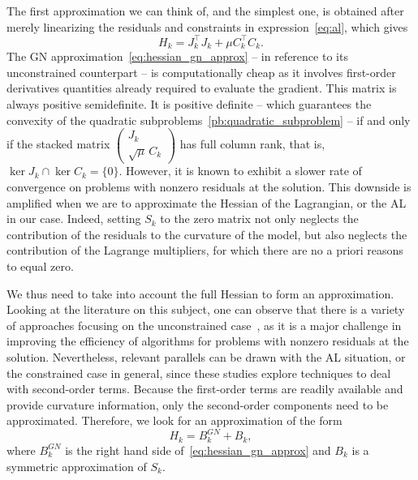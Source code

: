 \documentclass{article}
\numberwithin{equation}{section}
\theoremstyle{plain}
\begin{document}
	The first approximation we can think of, and the simplest one, is obtained after merely linearizing the residuals and constraints in expression~\eqref{eq:al}, which gives
	\begin{equation}\label{eq:hessian_gn_approx}
		H_k = J_k^\top J_k + \mu C_k^\top C_k.
	\end{equation}
	The GN approximation~\eqref{eq:hessian_gn_approx} -- in reference to its unconstrained counterpart -- is computationally cheap as it involves first-order derivatives quantities already required to evaluate the gradient. This matrix is always positive semidefinite. It is positive definite -- which guarantees the convexity of the quadratic subproblems~\eqref{pb:quadratic_subproblem} -- if and only if the stacked matrix $\left(\begin{smallmatrix} J_k \\ \sqrt{\mu}\,C_k \end{smallmatrix}\right)$ has full column rank, that is, $\ker J_k \cap \ker C_k = \{0\}$. However, it is known to exhibit a slower rate of convergence on problems with nonzero residuals at the solution. This downside is amplified when we are to approximate the Hessian of the Lagrangian, or the AL in our case. Indeed, setting $S_k$ to the zero matrix not only neglects the contribution of the residuals to the curvature of the model, but also neglects the contribution of the Lagrange multipliers, for which there are no a priori reasons to equal zero.
	
	We thus need to take into account the full Hessian to form an approximation. Looking at the literature on this subject, one can observe that there is a variety of approaches focusing on the unconstrained case~\cite{biggs:1977,dennisetal:1981,huschens1994,yabetakahashi:1991,zhang-etal:2000,lucksan-etal:2019}, as it is a major challenge in improving the efficiency of algorithms for problems with nonzero residuals at the solution. Nevertheless, relevant parallels can be drawn with the AL situation, or the constrained case in general, since these studies explore techniques to deal with second-order terms. Because the first-order terms are readily available and provide curvature information, only the second-order components need to be approximated. Therefore, we look for an approximation of the form 
	\begin{equation}\label{eq:hessian_full_approx}
		H_k = B^{GN}_k + B_k,
	\end{equation}
	where $B^{GN}_k$ is the right hand side of~\eqref{eq:hessian_gn_approx} and $B_k$ is a symmetric approximation of $S_k$. 
	
\end{document}
